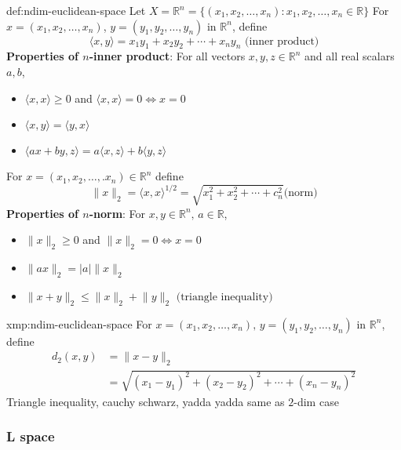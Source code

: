 \documentclass{article}
\begin{document}
\begin{dfn}{def:ndim-euclidean-space}{}
    Let $X = \mathbb{R}^{n} = \{(x_{1},x_{2},\dots,x_{n}) : x_{1},x_{2},\dots,x_{n}\in\mathbb{R}\}$
    \newline
    For $x = (x_{1},x_{2},\dots,x_{n})$, $y=(y_{1},y_{2},\dots,y_{n})$ in $\mathbb{R}^{n}$, define
    \[\langle x,y \rangle = x_{1}y_{1} + x_{2}y_{2} + \cdots + x_{n}y_{n} \text{ (inner product)}\]
    \textbf{Properties of $n$-inner product}: For all vectors $x,y,z\in\mathbb{R}^{n}$ and all real scalars $a,b$,
    \begin{itemize}
        \item $\langle x,x \rangle\ge 0$ and $\langle x,x \rangle=0 \iff x = 0$
        \item $\langle x,y \rangle = \langle y,x \rangle$
        \item $\langle ax+by,z \rangle = a\langle x,z \rangle + b\langle y,z \rangle$
    \end{itemize}
    For $x = (x_{1},x_{2},\dots,.x_{n})\in\mathbb{R}^{n}$ define
    \[\lVert x \rVert_{2} = \langle x,x \rangle^{1/2} = \sqrt{x^{2}_{1} + x^{2}_{2} + \cdots + c^{2}_{n}}\text{(norm)}\]
    \textbf{Properties of $n$-norm}: For $x,y\in\mathbb{R}^{n},\,a\in\mathbb{R}$,
    \begin{itemize}
        \item $\lVert x \rVert_{2}\ge 0$ and $\lVert x \rVert_{2}=0 \iff x = 0$
        \item $\lVert ax \rVert_{2}=\lvert a \rvert\lVert x \rVert_{2}$
        \item $\lVert x+y \rVert_{2}\le \lVert x \rVert_{2} + \lVert y \rVert_{2}\text{ (triangle inequality)}$
    \end{itemize}
\end{dfn}

\newpage
\begin{xmp}{xmp:ndim-euclidean-space}{}
    For $x = (x_{1},x_{2},\dots,x_{n}),\,y=(y_{1},y_{2},\dots,y_{n})$ in $\mathbb{R}^{n}$, define
    \begin{align*}
        d_{2}(x,y) &= \lVert x - y \rVert_{2} \\
                   &= \sqrt{(x_{1}-y_{1})^{2} + (x_{2}-y_{2})^{2} + \cdots + (x_{n} - y_{n})^{2}}
    \end{align*}
    Triangle inequality, cauchy schwarz, yadda yadda same as $2$-dim case
\end{xmp}

\subsubsection{L space}
\end{document}
